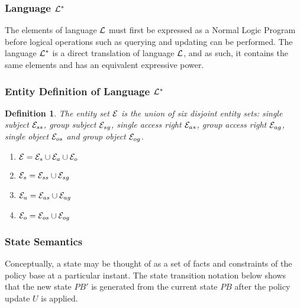 \documentclass[10pt, twocolumn]{article}
\newtheorem{definition}{Definition}
\begin{document}
      \subsubsection{Language ${\cal L}^{*}$}

        The elements of language ${\cal L}$ must first be expressed as a Normal
        Logic Program before logical operations such as querying and updating
        can be performed. The language ${\cal L}^{*}$ is a direct translation
        of language ${\cal L}$, and as such, it contains the same elements and
        has an equivalent expressive power.

      \subsubsection{Entity Definition of Language ${\cal L}^{*}$}

        \begin{definition}

          The entity set ${\cal E}$ is the union of six disjoint entity sets:
          single subject ${\cal E}_{ss}$, group subject ${\cal E}_{sg}$,
          single access right ${\cal E}_{as}$, group access right
          ${\cal E}_{ag}$, single object ${\cal E}_{os}$ and group object
          ${\cal E}_{og}$.

          \begin{enumerate}
            \item
              ${\cal E} = {\cal E}_{s} \cup {\cal E}_{a} \cup {\cal E}_{o}$
            \item
              ${\cal E}_{s} = {\cal E}_{ss} \cup {\cal E}_{sg}$
            \item
              ${\cal E}_{a} = {\cal E}_{as} \cup {\cal E}_{ag}$
            \item
              ${\cal E}_{o} = {\cal E}_{os} \cup {\cal E}_{og}$
          \end{enumerate}

        \end{definition}

      \subsubsection{State Semantics}

        Conceptually, a state may be thought of as a set of facts and
        constraints of the policy base at a particular instant. The state
        transition notation below shows that the new state $PB'$ is generated
        from the current state $PB$ after the policy update $U$ is applied.
\end{document}
